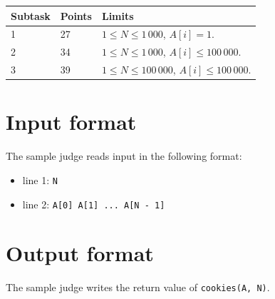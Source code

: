 \begin{tabular}{|l|l|l|}
  \hline
  \textbf{Subtask} & \textbf{Points} & \textbf{Limits} \\ \hline
  1 & 27 & $1 \le N \le 1\,000$,  $A[i] = 1$. \\ \hline
  2 & 34 & $1 \le N \le 1\,000$,  $A[i] \le 100\,000$. \\ \hline
  3 & 39 & $1 \le N \le 100\,000$,  $A[i] \le 100\,000$. \\ \hline
\end{tabular}

\section*{Input format}
The sample judge reads input in the following format:

\begin{itemize}
  \item line 1: \texttt{N}
  \item line 2: \texttt{A[0] A[1] ... A[N - 1]}
\end{itemize}

\section*{Output format}
The sample judge writes the return value of \texttt{cookies(A, N)}.
